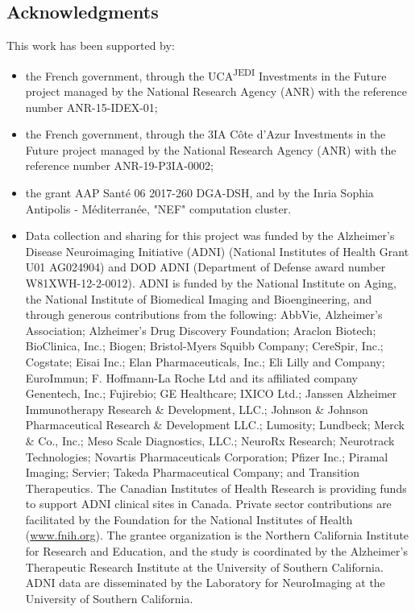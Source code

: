 \subsection*{Acknowledgments}
\label{sec:ack}

This work has been supported by:
\begin{itemize}
%
\item the French government, through the UCA\textsuperscript{JEDI} Investments in the Future project managed by the National Research Agency (ANR) with the reference number ANR-15-IDEX-01;
%
\item the French government, through the 3IA Côte d'Azur Investments in the Future project managed by the National Research Agency (ANR) with the reference number ANR-19-P3IA-0002;
%
\item the grant AAP Santé 06 2017-260 DGA-DSH, and by the Inria Sophia Antipolis - Méditerranée, "NEF" computation cluster.
%
\item Data collection and sharing for this project was funded by the Alzheimer's Disease Neuroimaging Initiative (ADNI) (National Institutes of Health Grant U01 AG024904) and DOD ADNI (Department of Defense award number W81XWH-12-2-0012).
ADNI is funded by the National Institute on Aging, the National Institute of Biomedical Imaging and Bioengineering, and through generous contributions from the following:
AbbVie, Alzheimer's Association; Alzheimer's Drug Discovery Foundation; Araclon Biotech; BioClinica, Inc.; Biogen; Bristol-Myers Squibb Company; CereSpir, Inc.; Cogstate; Eisai Inc.; Elan Pharmaceuticals, Inc.; Eli Lilly and Company; EuroImmun; F. Hoffmann-La Roche Ltd and its affiliated company Genentech, Inc.; Fujirebio; GE Healthcare; IXICO Ltd.; Janssen Alzheimer Immunotherapy Research \& Development, LLC.; Johnson \& Johnson Pharmaceutical Research \& Development LLC.; Lumosity; Lundbeck; Merck \& Co., Inc.; Meso Scale Diagnostics, LLC.; NeuroRx Research; Neurotrack Technologies; Novartis Pharmaceuticals Corporation; Pfizer Inc.; Piramal Imaging; Servier; Takeda Pharmaceutical Company; and Transition Therapeutics.
The Canadian Institutes of Health Research is providing funds to support ADNI clinical sites in Canada.
Private sector contributions are facilitated by the Foundation for the National Institutes of Health (\url{www.fnih.org}).
The grantee organization is the Northern California Institute for Research and Education, and the study is coordinated by the Alzheimer's Therapeutic Research Institute at the University of Southern California.
ADNI data are disseminated by the Laboratory for NeuroImaging at the University of Southern California.

\end{itemize}
